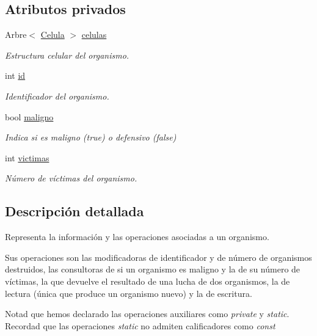 \subsection*{\-Atributos privados}
\begin{DoxyCompactItemize}
\item 
\-Arbre$<$ \hyperlink{class_celula}{\-Celula} $>$ \hyperlink{class_organismo_abfafb8e55144e295b406ce90951f0c68}{celulas}
\begin{DoxyCompactList}\small\item\em \-Estructura celular del organismo. \end{DoxyCompactList}\item 
int \hyperlink{class_organismo_a30be1823d3711fec651a5a4b1dc1cee5}{id}
\begin{DoxyCompactList}\small\item\em \-Identificador del organismo. \end{DoxyCompactList}\item 
bool \hyperlink{class_organismo_a85a5d1b9d31fa209d1ed0d596dbbed61}{maligno}
\begin{DoxyCompactList}\small\item\em \-Indica si es maligno (true) o defensivo (false) \end{DoxyCompactList}\item 
int \hyperlink{class_organismo_abb3e56487a080df544a6ff96e5e42520}{victimas}
\begin{DoxyCompactList}\small\item\em \-Número de víctimas del organismo. \end{DoxyCompactList}\end{DoxyCompactItemize}


\subsection{\-Descripción detallada}
\-Representa la información y las operaciones asociadas a un organismo. 

\-Sus operaciones son las modificadoras de identificador y de número de organismos destruidos, las consultoras de si un organismo es maligno y la de su número de víctimas, la que devuelve el resultado de una lucha de dos organismos, la de lectura (única que produce un organismo nuevo) y la de escritura.

\-Notad que hemos declarado las operaciones auxiliares como {\itshape private\/} y {\itshape static\/}. \-Recordad que las operaciones {\itshape static\/} no admiten calificadores como {\itshape const\/} 


